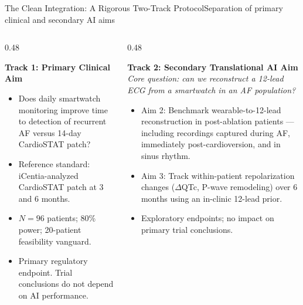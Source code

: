 \documentclass[aspectratio=169,10pt]{beamer}
\begin{document}
\begin{frame}{The Clean Integration: A Rigorous Two-Track Protocol}{Separation of primary clinical and secondary AI aims}
\begin{columns}[T]
  \begin{column}{0.48\textwidth}
    \begin{block}{\textbf{Track 1: Primary Clinical Aim}}
      \scriptsize
      \begin{itemize}
        \setlength{\itemsep}{0.2em}
        \item Does daily smartwatch monitoring improve time to detection of recurrent AF versus 14-day CardioSTAT patch?
        \item Reference standard: iCentia-analyzed CardioSTAT patch at 3 and 6 months.
        \item $N=96$ patients; 80\% power; 20-patient feasibility vanguard.
        \item Primary regulatory endpoint. Trial conclusions do not depend on AI performance.
      \end{itemize}
    \end{block}
  \end{column}
  \begin{column}{0.48\textwidth}
    \begin{block}{\textbf{Track 2: Secondary Translational AI Aim}}
      \scriptsize
      \textit{Core question: can we reconstruct a 12-lead ECG from a smartwatch in an AF population?}
      \vspace{0.3em}
      \begin{itemize}
        \setlength{\itemsep}{0.2em}
        \item Aim 2: Benchmark wearable-to-12-lead reconstruction in post-ablation patients --- including recordings captured during AF, immediately post-cardioversion, and in sinus rhythm.
        \item Aim 3: Track within-patient repolarization changes ($\Delta$QTc, P-wave remodeling) over 6 months using an in-clinic 12-lead prior.
        \item Exploratory endpoints; no impact on primary trial conclusions.
      \end{itemize}
    \end{block}
  \end{column}

\end{columns}
\end{frame}
\end{document}
